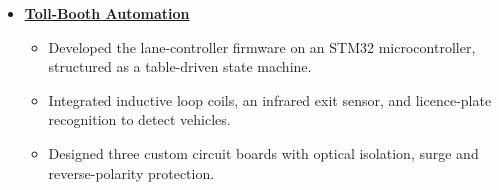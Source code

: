 \documentclass[10pt]{article}
\begin{document}
\begin{itemize}[label={}, leftmargin=0pt, itemsep=5pt]
    \item \textbf{\href{https://github.com/Mainul-Islam-07/Tollbooth_Automation}{Toll-Booth Automation}}
    \begin{itemize}
        \item Developed the lane-controller firmware on an STM32 microcontroller, structured as a
        table-driven state machine.
        \item Integrated inductive loop coils, an infrared exit sensor, and licence-plate
        recognition to detect vehicles.
        \item Designed three custom circuit boards with optical isolation, surge and reverse-polarity protection.
    \end{itemize}




\end{itemize}
\end{document}
